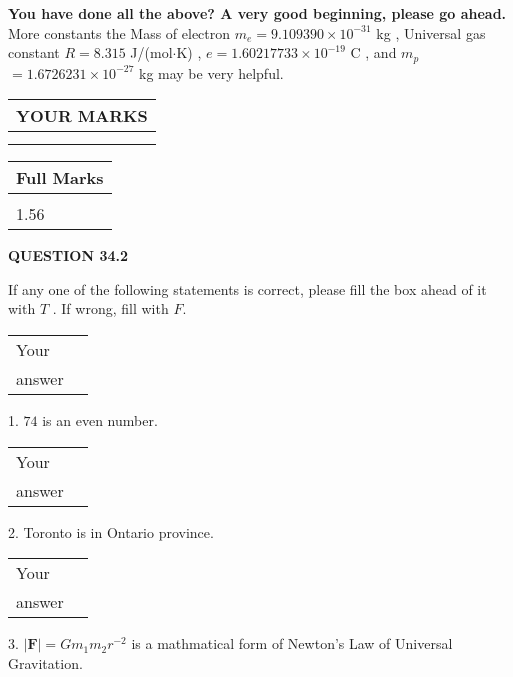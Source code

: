 \documentclass[12pt]{article}
\begin{document}
 
\vspace{0.3in}
   
   
\vspace{0.3in}
{\textbf{\LARGE{You have done all the above? A very good beginning, please go ahead.}}}
More constants the
Mass of electron
$m_e$$ =
9.109390 \times 10^{-31} $
kg
,
Universal gas constant
$R$$ =
8.315 $
J/(mol$\cdot $K)
,
$e$$ =
1.60217733 \times 10^{-19} $
C
, and
$m_p$$ =
1.6726231 \times 10^{-27} $
kg
%
may be very helpful.
\vspace{0.3in}
   
   
  
\vspace{0.2in}
  
\noindent\begin{tabular}{|l|}
\hline
 YOUR MARKS  \\
\hline
 \\ 
 \\ 
\hline
\end{tabular}
\hspace{0.05in} \begin{tabular}{|l|}
\hline
 Full Marks  \\
\hline
 \\ 
1.56 \\
\hline
\end{tabular}
{\textbf{\Large{QUESTION
34.2 
}}}
  
  
If any one of the following statements is correct, please fill the box ahead of it with $T$ .
If wrong, fill with $F$.
 
\noindent\begin{tabular}{|l|l|}\hline Your&\hspace{.2in} \\ answer&\hspace{.2in} \\ \hline \end{tabular}
1. $ %
74$ is an  %
even number.
 
\noindent\begin{tabular}{|l|l|}\hline Your&\hspace{.2in} \\ answer&\hspace{.2in} \\ \hline \end{tabular}
2.  %
Toronto is in  %
Ontario province.
 
\noindent\begin{tabular}{|l|l|}\hline Your&\hspace{.2in} \\ answer&\hspace{.2in} \\ \hline \end{tabular}
3.  %
$\left| \mathbf{F}\right| =Gm_1m_2r^{-2}$ is a mathmatical form of
Newton's Law of Universal Gravitation.
 
\end{document}
